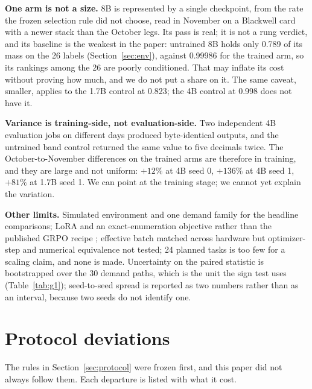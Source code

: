 \documentclass[11pt]{article}
\begin{document}
\textbf{One arm is not a size.} 8B is represented by a single checkpoint, from the rate the frozen
selection rule did not choose, read in November on a Blackwell card with a newer stack than the
October legs. Its pass is real; it is not a rung verdict, and its baseline is the weakest in the paper: untrained
8B holds only 0.789 of its mass on the 26 labels (Section~\ref{sec:env}), against 0.99986 for the
trained arm, so its rankings among the 26 are poorly conditioned. That may inflate its cost without
proving how much, and we do not put a share on it. The same caveat, smaller, applies
to the 1.7B control at 0.823; the 4B control at 0.998 does not have it.

\textbf{Variance is training-side, not evaluation-side.} Two independent 4B evaluation jobs on different
days produced byte-identical outputs, and the untrained band control returned the same value to five
decimals twice. The October-to-November differences on the trained arms are therefore in training, and
they are large and not uniform: $+12\%$ at 4B seed 0, $+136\%$ at 4B seed 1, $+81\%$ at 1.7B seed 1.
We can point at the training stage; we cannot yet explain the variation.

\textbf{Other limits.} Simulated environment and one demand family for the headline comparisons; LoRA and
an exact-enumeration objective rather than the published GRPO recipe \cite{grpo}; effective batch
matched across hardware but optimizer-step and numerical equivalence not tested; 24 planned tasks is
too few for a scaling claim, and none is made. Uncertainty on the paired statistic is bootstrapped
over the 30 demand paths, which is the unit the sign test uses (Table~\ref{tab:g1}); seed-to-seed
spread is reported as two numbers rather than as an interval, because two seeds do not identify one.

\section{Protocol deviations}\label{sec:deviations}

The rules in Section~\ref{sec:protocol} were frozen first, and this paper did not always follow them.
Each departure is listed with what it cost.
\end{document}
